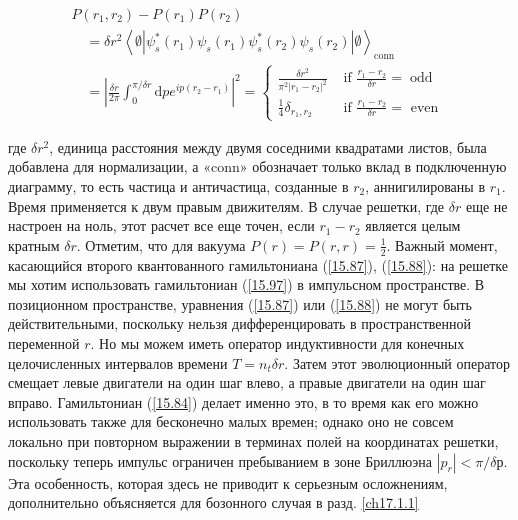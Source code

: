 \documentclass[main.tex]{subfiles}
\begin{document}
\begin{equation}\label{15.99}
	\begin{array}{l}
{P\left(r_{1}, r_{2}\right)-P\left(r_{1}\right) P\left(r_{2}\right)} \\
{\quad=\delta r^{2}\left\langle\emptyset\left|\psi_{s}^{*}\left(r_{1}\right) \psi_{s}\left(r_{1}\right) \psi_{s}^{*}\left(r_{2}\right) \psi_{s}\left(r_{2}\right)\right| \emptyset\right\rangle_{\mathrm{conn}}} \\
{\quad=\left|\frac{\delta r}{2 \pi} \int_{0}^{\pi / \delta r} \mathrm{d} p e^{i p\left(r_{2}-r_{1}\right)}\right|^{2}=\left\{\begin{array}{cc}
{\frac{\delta r^{2}}{\pi^{2}\left|r_{1}-r_{2}\right|^{2}}} & {\text { if } \frac{r_{1}-r_{2}}{\delta r}=\operatorname{odd}} \\
{\frac{1}{4} \delta_{r_{1}, r_{2}}} & {\text { if } \frac{r_{1}-r_{2}}{\delta r}=\text { even }}
\end{array}\right.}
\end{array}
\end{equation}
 
где $\delta r^2$, единица расстояния между двумя соседними квадратами листов, была добавлена для нормализации, а «conn» обозначает только вклад в подключенную диаграмму, то есть частица и античастица, созданные в $r_2$, аннигилированы в $r_1$. Время применяется к двум правым движителям. В случае решетки, где $\delta r$ еще не настроен на ноль, этот расчет все еще точен, если $r_1 - r_2$ является целым кратным $\delta r$. Отметим, что для вакуума $P (r) = P (r, r) = \frac 1 2$.
Важный момент, касающийся второго квантованного гамильтониана (\ref{15.87}), (\ref{15.88}): на решетке мы хотим использовать гамильтониан (\ref{15.97}) в импульсном пространстве. В позиционном пространстве, уравнения (\ref{15.87}) или (\ref{15.88}) не могут быть действительными, поскольку нельзя дифференцировать в пространственной переменной $r$. Но мы можем иметь оператор индуктивности для конечных целочисленных интервалов времени $T = n_t\delta r$. Затем этот эволюционный оператор смещает левые двигатели на один шаг влево, а правые двигатели на один шаг вправо. Гамильтониан (\ref{15.84}) делает именно это, в то время как его можно использовать также для бесконечно малых времен; однако оно не совсем локально при повторном выражении в терминах полей на координатах решетки, поскольку теперь импульс ограничен пребыванием в зоне Бриллюэна $| p_r | <\pi / \delta р$. Эта особенность, которая здесь не приводит к серьезным осложнениям, дополнительно объясняется для бозонного случая в разд. \ref{ch17.1.1}
\end{document}
